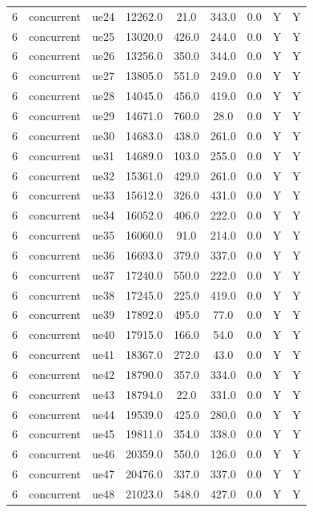 \begin{table}[ht]
\begin{tabular}{|c|c|c|c|c|c|c|c|c|}
6 & concurrent & ue24 & 12262.0 & 21.0 & 343.0 & 0.0 & Y & Y \\
6 & concurrent & ue25 & 13020.0 & 426.0 & 244.0 & 0.0 & Y & Y \\
6 & concurrent & ue26 & 13256.0 & 350.0 & 344.0 & 0.0 & Y & Y \\
6 & concurrent & ue27 & 13805.0 & 551.0 & 249.0 & 0.0 & Y & Y \\
6 & concurrent & ue28 & 14045.0 & 456.0 & 419.0 & 0.0 & Y & Y \\
6 & concurrent & ue29 & 14671.0 & 760.0 & 28.0 & 0.0 & Y & Y \\
6 & concurrent & ue30 & 14683.0 & 438.0 & 261.0 & 0.0 & Y & Y \\
6 & concurrent & ue31 & 14689.0 & 103.0 & 255.0 & 0.0 & Y & Y \\
6 & concurrent & ue32 & 15361.0 & 429.0 & 261.0 & 0.0 & Y & Y \\
6 & concurrent & ue33 & 15612.0 & 326.0 & 431.0 & 0.0 & Y & Y \\
6 & concurrent & ue34 & 16052.0 & 406.0 & 222.0 & 0.0 & Y & Y \\
6 & concurrent & ue35 & 16060.0 & 91.0 & 214.0 & 0.0 & Y & Y \\
6 & concurrent & ue36 & 16693.0 & 379.0 & 337.0 & 0.0 & Y & Y \\
6 & concurrent & ue37 & 17240.0 & 550.0 & 222.0 & 0.0 & Y & Y \\
6 & concurrent & ue38 & 17245.0 & 225.0 & 419.0 & 0.0 & Y & Y \\
6 & concurrent & ue39 & 17892.0 & 495.0 & 77.0 & 0.0 & Y & Y \\
6 & concurrent & ue40 & 17915.0 & 166.0 & 54.0 & 0.0 & Y & Y \\
6 & concurrent & ue41 & 18367.0 & 272.0 & 43.0 & 0.0 & Y & Y \\
6 & concurrent & ue42 & 18790.0 & 357.0 & 334.0 & 0.0 & Y & Y \\
6 & concurrent & ue43 & 18794.0 & 22.0 & 331.0 & 0.0 & Y & Y \\
6 & concurrent & ue44 & 19539.0 & 425.0 & 280.0 & 0.0 & Y & Y \\
6 & concurrent & ue45 & 19811.0 & 354.0 & 338.0 & 0.0 & Y & Y \\
6 & concurrent & ue46 & 20359.0 & 550.0 & 126.0 & 0.0 & Y & Y \\
6 & concurrent & ue47 & 20476.0 & 337.0 & 337.0 & 0.0 & Y & Y \\
6 & concurrent & ue48 & 21023.0 & 548.0 & 427.0 & 0.0 & Y & Y \\

\end{tabular}
\end{table}
